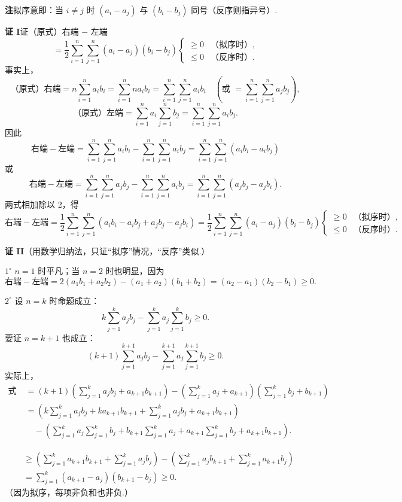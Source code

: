 \documentclass[UTF8, 12pt, fontset=fandol, oneside]{ctexart}
\begin{document}
\noindent\textbf{注}\quad 拟序意即：当 $i\ne j$ 时 $(a_i-a_j)$ 与 $(b_i-b_j)$ 同号（反序则指异号）.

\noindent\textbf{证 I}\quad 证（原式）右端 $-$ 左端
\[
=\frac12\sum_{i=1}^n\sum_{j=1}^n(a_i-a_j)(b_i-b_j)
\begin{cases}
\ge0&\text{（拟序时）},\\
\le0&\text{（反序时）}.
\end{cases}
\]
事实上，
\[
\text{（原式）右端}=n\sum_{i=1}^n a_i b_i
=\sum_{i=1}^n na_i b_i
=\sum_{i=1}^n\sum_{j=1}^n a_i b_i
\quad\left(\text{或 }=\sum_{i=1}^n\sum_{j=1}^n a_jb_j\right),
\]
\[
\text{（原式）左端}=\sum_{i=1}^n a_i\sum_{j=1}^n b_j
=\sum_{i=1}^n\sum_{j=1}^n a_i b_j.
\]
因此
\[
\text{右端}-\text{左端}
=\sum_{i=1}^n\sum_{j=1}^n a_i b_i
-\sum_{i=1}^n\sum_{j=1}^n a_i b_j
=\sum_{i=1}^n\sum_{j=1}^n(a_i b_i-a_i b_j)
\]
或
\[
\text{右端}-\text{左端}
=\sum_{i=1}^n\sum_{j=1}^n a_j b_j
-\sum_{i=1}^n\sum_{j=1}^n a_i b_j
=\sum_{i=1}^n\sum_{j=1}^n(a_j b_j-a_j b_i).
\]
两式相加除以 2，得
\[
\text{右端}-\text{左端}
=\frac12\sum_{i=1}^n\sum_{j=1}^n(a_i b_i-a_i b_j+a_j b_j-a_j b_i)
=\frac12\sum_{i=1}^n\sum_{j=1}^n(a_i-a_j)(b_i-b_j)
\begin{cases}
\ge0&\text{（拟序时）},\\
\le0&\text{（反序时）}.
\end{cases}
\]

\noindent\textbf{证 II}\quad （用数学归纳法，只证“拟序”情况，“反序”类似.）

$1^\circ$ $n=1$ 时平凡；当 $n=2$ 时也明显，因为
\[
\text{右端}-\text{左端}
=2(a_1b_1+a_2b_2)-(a_1+a_2)(b_1+b_2)
=(a_2-a_1)(b_2-b_1)\ge0.
\]

$2^\circ$ 设 $n=k$ 时命题成立：
\[
k\sum_{j=1}^k a_jb_j-\sum_{j=1}^k a_j\sum_{j=1}^k b_j\ge0. \tag{1}
\]
要证 $n=k+1$ 也成立：
\[
(k+1)\sum_{j=1}^{k+1}a_jb_j-\sum_{j=1}^{k+1}a_j\sum_{j=1}^{k+1}b_j\ge0. \tag{2}
\]
实际上，
\[
\begin{aligned}
\text{式 (2) 左端}
&=(k+1)\left(\sum_{j=1}^k a_jb_j+a_{k+1}b_{k+1}\right)
-\left(\sum_{j=1}^k a_j+a_{k+1}\right)\left(\sum_{j=1}^k b_j+b_{k+1}\right)\\
&=\left(k\sum_{j=1}^k a_jb_j+ka_{k+1}b_{k+1}
+\sum_{j=1}^k a_jb_j+a_{k+1}b_{k+1}\right)\\
&\quad-\left(\sum_{j=1}^k a_j\sum_{j=1}^k b_j
+b_{k+1}\sum_{j=1}^k a_j+a_{k+1}\sum_{j=1}^k b_j+a_{k+1}b_{k+1}\right).
\end{aligned}
\]

\[
\begin{aligned}
&\ge\left(\sum_{j=1}^k a_{k+1}b_{k+1}
+\sum_{j=1}^k a_jb_j\right)
-\left(\sum_{j=1}^k a_jb_{k+1}
+\sum_{j=1}^k a_{k+1}b_j\right)\\
&=\sum_{j=1}^k(a_{k+1}-a_j)(b_{k+1}-b_j)\ge0.
\end{aligned}
\]
（因为拟序，每项非负和也非负.）
\end{document}

